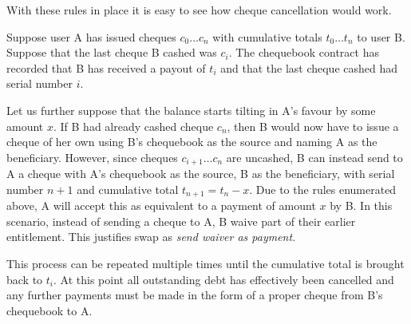 With these rules in place it is easy to see how cheque cancellation would work. 


Suppose user A has issued cheques $c_0 \ldots c_n$ with cumulative totals $t_0 \ldots t_n$ to user B. Suppose that the last cheque B cashed was $c_i$. The chequebook contract has recorded that B has received a payout of $t_i$ and that the last cheque cashed had serial number $i$.

Let us further suppose that the balance starts tilting in A's favour by some amount $x$. If B had already cashed cheque $c_n$, then B would now have to issue a cheque of her own using B's chequebook as the source and naming A as the beneficiary. However, since cheques $c_{i+1} \ldots c_n$  are uncashed, B can instead send to A a cheque with A's chequebook as the source, B as the beneficiary, with serial number $n+1$ and cumulative total $t_{n+1} = t_n - x$. Due to the rules enumerated above, A will accept this as equivalent to a payment of amount $x$ by B.  In this scenario, instead of sending a cheque to A, B waive part of their earlier entitlement. This justifies swap as \emph{send waiver as payment}.

This process can be repeated multiple times until the cumulative total is brought back to $t_i$. At this point all outstanding debt has effectively been cancelled and any further payments must be made in the form of a proper cheque from B's chequebook to A.


